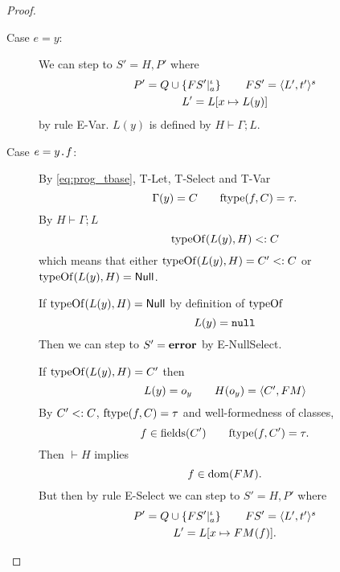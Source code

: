 \begin{proof}
\begin{description}
\begin{description}
        \item[Case $e = y$:]
          We can step to $S' = H, P'$ where
          \begin{equation*}
            \begin{gathered}
              P' = Q \cup \left\{FS'|_a^\iota \right\} \quad\quad FS' = \mbox{$\langle L',
              t' \rangle^s$} \\
              L' = L[x \mapsto L(y)]
            \end{gathered}
          \end{equation*}
          by rule {\sc E-Var}. $L(y)$ is defined by $H \vdash \Gamma;L$. \contradiction

        \item[Case $e = \mbox{\mdseries$y$\texttt{.}$f$}$:]
          By \eqref{eq:prog_tbase}, {\sc T-Let}, {\sc T-Select} and {\sc T-Var}
          \begin{equation*}
            \Gamma(y) = C \quad\quad \mbox{$\mathrm{ftype}$}(f, C) = \tau.
          \end{equation*}
          By $H \vdash \Gamma;L$
          \begin{equation*}
            \mbox{$\mathrm{typeOf}$}(L(y), H) <: C
          \end{equation*}
          which means that either $\mbox{$\mathrm{typeOf}$}(L(y), H) = C' <: C$ or \\
          $\mbox{$\mathrm{typeOf}$}(L(y), H) = \mbox{$\mathsf{Null}$}$. 
          
          If $\mbox{$\mathrm{typeOf}$}(L(y), H) = \mbox{$\mathsf{Null}$}$ by definition of $\mbox{$\mathrm{typeOf}$}$
          \begin{equation*}
            L(y) = \mbox{\mdseries\texttt{null}}
          \end{equation*}
          Then we can step to $S' = \mbox{{\bf error}}$ by {\sc E-NullSelect}.
          \contradiction

          If $\mbox{$\mathrm{typeOf}$}(L(y), H) = C'$ then
          \begin{equation*}
            L(y) = o_y \quad\quad H(o_y) = \mbox{$\langle C', FM \rangle$}
          \end{equation*}
          By $C' <: C$, $\mbox{$\mathrm{ftype}$}(f, C) = \tau$ and well-formedness of
          classes,
          \begin{equation*}
            f \in \mbox{$\mathrm{fields}$}(C') \quad\quad \mbox{$\mathrm{ftype}$}(f, C') = \tau.
          \end{equation*}
          Then $\vdash H$ implies
          \begin{equation*}
            f \in \mbox{$\mathrm{dom}$}(FM).
          \end{equation*}
          But then by rule {\sc E-Select} we can step to $S' = H, P'$ where
          \begin{equation*}
            \begin{gathered}
              P' = Q \cup \left\{FS'|_a^\iota \right\} \quad\quad FS' = \mbox{$\langle L',
              t' \rangle^s$} \\
              L' = L[x \mapsto FM(f)].
            \end{gathered}
          \end{equation*}
          \contradiction


\end{description}
\end{description}
\end{proof}
